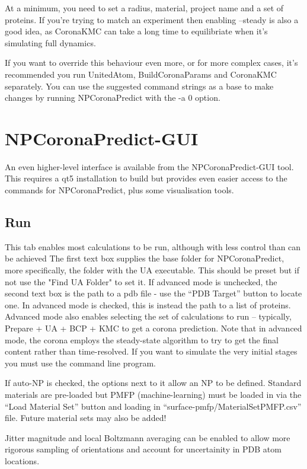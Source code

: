 \documentclass[10pt,a4paper,onecolumn]{report}
\begin{document}
At a minimum, you need to set a radius, material, project name and a set of proteins. If you're trying to match an experiment then enabling --steady is also a good idea, as CoronaKMC can take a long time to equilibriate when it's simulating full dynamics.


If you want to override this behaviour even more, or for more complex cases, it's recommended you run UnitedAtom, BuildCoronaParams and CoronaKMC separately. You can use the suggested command strings as a base to make changes by running NPCoronaPredict with the -a 0 option.

\section{NPCoronaPredict-GUI}
An even higher-level interface is available from the NPCoronaPredict-GUI tool. This requires a qt5 installation to build but provides even easier access to the commands for NPCoronaPredict, plus some visualisation tools.

\subsection{Run}
This tab enables most calculations to be run, although with less control than can be achieved
The first text box supplies the base folder for NPCoronaPredict, more specifically, the folder with the UA executable. This should be preset but if not use the "Find UA Folder" to set it.
If advanced mode is unchecked, the second text box is the path to a pdb file - use the ``PDB Target'' button to locate one.
In advanced mode is checked, this is instead the path to a list of proteins. Advanced mode also enables selecting the set of calculations to run -- typically, Prepare + UA + BCP + KMC to get a corona prediction.
Note that in advanced mode, the corona employs the steady-state algorithm to try to get the final content rather than time-resolved. If you want to simulate the very initial stages you must use the command line program.


If auto-NP is checked, the options next to it allow an NP to be defined. Standard materials are pre-loaded but PMFP (machine-learning) must be loaded in via the ``Load Material Set'' button and loading in ``surface-pmfp/MaterialSetPMFP.csv'' file. Future material sets may also be added!

Jitter magnitude and local Boltzmann averaging can be enabled to allow more rigorous sampling of orientations and account for uncertainity in PDB atom locations.
\end{document}
